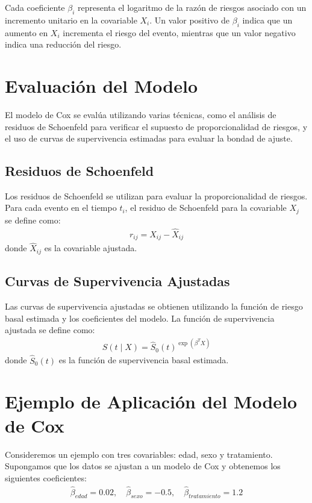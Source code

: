 \documentclass[a4paper]{report} %
\begin{document}
Cada coeficiente $\beta_i$ representa el logaritmo de la raz\'on de riesgos asociado con un incremento unitario en la covariable $X_i$. Un valor positivo de $\beta_i$ indica que un aumento en $X_i$ incrementa el riesgo del evento, mientras que un valor negativo indica una reducci\'on del riesgo.

\section*{Evaluaci\'on del Modelo}
El modelo de Cox se eval\'ua utilizando varias t\'ecnicas, como el an\'alisis de residuos de Schoenfeld para verificar el supuesto de proporcionalidad de riesgos, y el uso de curvas de supervivencia estimadas para evaluar la bondad de ajuste.

\subsection*{Residuos de Schoenfeld}
Los residuos de Schoenfeld se utilizan para evaluar la proporcionalidad de riesgos. Para cada evento en el tiempo $t_i$, el residuo de Schoenfeld para la covariable $X_j$ se define como:
\begin{eqnarray*}
r_{ij} = X_{ij} - \hat{X}_{ij}
\end{eqnarray*}
donde $\hat{X}_{ij}$ es la covariable ajustada.

\subsection*{Curvas de Supervivencia Ajustadas}
Las curvas de supervivencia ajustadas se obtienen utilizando la funci\'on de riesgo basal estimada y los coeficientes del modelo. La funci\'on de supervivencia ajustada se define como:
\begin{eqnarray*}
\hat{S}(t \mid X) = \hat{S}_0(t)^{\exp(\beta^T X)}
\end{eqnarray*}
donde $\hat{S}_0(t)$ es la funci\'on de supervivencia basal estimada.

\section*{Ejemplo de Aplicaci\'on del Modelo de Cox}
Consideremos un ejemplo con tres covariables: edad, sexo y tratamiento. Supongamos que los datos se ajustan a un modelo de Cox y obtenemos los siguientes coeficientes:
\begin{eqnarray*}
\hat{\beta}_{edad} = 0.02, \quad \hat{\beta}_{sexo} = -0.5, \quad \hat{\beta}_{tratamiento} = 1.2
\end{eqnarray*}
\end{document}
